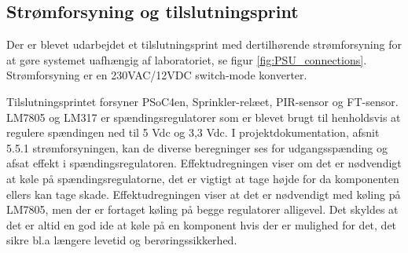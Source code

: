 \subsection{Strømforsyning og tilslutningsprint}

Der er blevet udarbejdet et tilslutningsprint med dertilhørende strømforsyning for at gøre systemet uafhængig af laboratoriet, se figur \ref{fig:PSU_connections}. Strømforsyning er en 230VAC/12VDC switch-mode konverter.


Tilslutningsprintet forsyner PSoC4en, Sprinkler-relæet, PIR-sensor og FT-sensor. LM7805 og LM317 er spændingsregulatorer som er blevet brugt til henholdsvis at regulere spændingen ned til 5 Vdc og 3,3 Vdc. I projektdokumentation, afsnit 5.5.1 strømforsyningen, kan de diverse beregninger ses for udgangsspænding og afsat effekt i spændingsregulatoren. Effektudregningen viser om det er nødvendigt at køle på spændingsregulatorne, det er vigtigt at tage højde for da komponenten ellers kan tage skade. Effektudregningen viser at det er nødvendigt med køling på LM7805, men der er fortaget køling på begge regulatorer alligevel. Det skyldes at det er altid en god ide at køle på en komponent hvis der er mulighed for det, det sikre bl.a længere levetid og berøringssikkerhed.

   